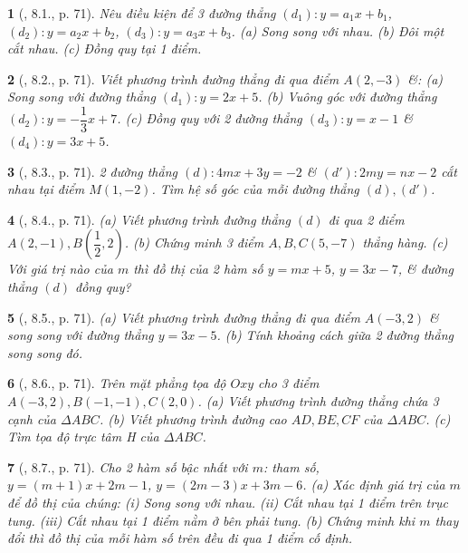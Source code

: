 \documentclass{article}
\newtheorem{baitoan}{}
\begin{document}
\begin{baitoan}[\cite{Binh_boi_duong_Toan_9_tap_1}, 8.1., p. 71]
	Nêu điều kiện để 3 đường thẳng $(d_1):y = a_1x + b_1$, $(d_2):y = a_2x + b_2$, $(d_3):y = a_3x + b_3$. (a) Song song với nhau. (b) Đôi một cắt nhau. (c) Đồng quy tại 1 điểm.
\end{baitoan}

\begin{baitoan}[\cite{Binh_boi_duong_Toan_9_tap_1}, 8.2., p. 71]
	Viết phương trình đường thẳng đi qua điểm $A(2,-3)$ \&: (a) Song song với đường thẳng $(d_1):y = 2x + 5$. (b) Vuông góc với đường thẳng $(d_2):y = -\dfrac{1}{3}x + 7$. (c) Đồng quy với 2 đường thẳng $(d_3):y = x - 1$ \& $(d_4):y = 3x + 5$.
\end{baitoan}

\begin{baitoan}[\cite{Binh_boi_duong_Toan_9_tap_1}, 8.3., p. 71]
	2 đường thẳng $(d):4mx + 3y = -2$ \& $(d'):2my = nx - 2$ cắt nhau tại điểm $M(1,-2)$. Tìm hệ số góc của mỗi đường thẳng $(d),(d')$.
\end{baitoan}

\begin{baitoan}[\cite{Binh_boi_duong_Toan_9_tap_1}, 8.4., p. 71]
	(a) Viết phương trình đường thẳng $(d)$ đi qua 2 điểm $A(2,-1),B\left(\dfrac{1}{2},2\right)$. (b) Chứng minh 3 điểm $A,B,C(5,-7)$ thẳng hàng. (c) Với giá trị nào của $m$ thì đồ thị của 2 hàm số $y = mx + 5$, $y = 3x - 7$, \& đường thẳng $(d)$ đồng quy?
\end{baitoan}

\begin{baitoan}[\cite{Binh_boi_duong_Toan_9_tap_1}, 8.5., p. 71]
	(a) Viết phương trình đường thẳng đi qua điểm $A(-3,2)$ \& song song với đường thẳng $y = 3x - 5$. (b) Tính khoảng cách giữa 2 đường thẳng song song đó.
\end{baitoan}

\begin{baitoan}[\cite{Binh_boi_duong_Toan_9_tap_1}, 8.6., p. 71]
	Trên mặt phẳng tọa độ $Oxy$ cho 3 điểm $A(-3,2),B(-1,-1),C(2,0)$. (a) Viết phương trình đường thẳng chứa 3 cạnh của $\Delta ABC$. (b) Viết phương trình đường cao $AD,BE,CF$ của $\Delta ABC$. (c) Tìm tọa độ trực tâm H của $\Delta ABC$.
\end{baitoan}

\begin{baitoan}[\cite{Binh_boi_duong_Toan_9_tap_1}, 8.7., p. 71]
	Cho 2 hàm số bậc nhất với $m$: tham số, $y = (m + 1)x + 2m - 1$, $y = (2m - 3)x + 3m - 6$. (a) Xác định giá trị của $m$ để đồ thị của chúng: (i) Song song với nhau. (ii) Cắt nhau tại 1 điểm trên trục tung. (iii) Cắt nhau tại 1 điểm nằm ở bên phải tung. (b) Chứng minh khi $m$ thay đổi thì đồ thị của mỗi hàm số trên đều đi qua 1 điểm cố định.
\end{baitoan}
\end{document}
